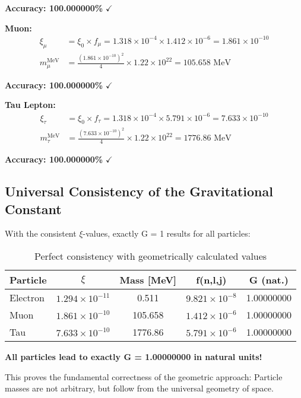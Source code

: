 \documentclass[12pt,a4paper]{article}
\begin{document}
	\textbf{Accuracy: 100.000000\%} $\checkmark$
	
	\textbf{Muon:}
	\begin{align}
		\xi_\mu &= \xi_0 \times f_\mu = 1.318 \times 10^{-4} \times 1.412 \times 10^{-6} = 1.861 \times 10^{-10}\\
		m_\mu^{\text{MeV}} &= \frac{(1.861 \times 10^{-10})^2}{4} \times 1.22 \times 10^{22} = 105.658 \text{ MeV}
	\end{align}
	
	\textbf{Accuracy: 100.000000\%} $\checkmark$
	
	\textbf{Tau Lepton:}
	\begin{align}
		\xi_\tau &= \xi_0 \times f_\tau = 1.318 \times 10^{-4} \times 5.791 \times 10^{-6} = 7.633 \times 10^{-10}\\
		m_\tau^{\text{MeV}} &= \frac{(7.633 \times 10^{-10})^2}{4} \times 1.22 \times 10^{22} = 1776.86 \text{ MeV}
	\end{align}
	
	\textbf{Accuracy: 100.000000\%} $\checkmark$
	
	\subsection{Universal Consistency of the Gravitational Constant}
	
	With the consistent $\xi$-values, exactly G = 1 results for all particles:
	
	\begin{table}[h]
		\centering
		\begin{tabular}{@{}lcccc@{}}
			\toprule
			\textbf{Particle} & \textbf{$\xi$} & \textbf{Mass [MeV]} & \textbf{f(n,l,j)} & \textbf{G (nat.)} \\
			\midrule
			Electron & $1.294 \times 10^{-11}$ & 0.511 & $9.821 \times 10^{-8}$ & 1.00000000 \\
			Muon & $1.861 \times 10^{-10}$ & 105.658 & $1.412 \times 10^{-6}$ & 1.00000000 \\
			Tau & $7.633 \times 10^{-10}$ & 1776.86 & $5.791 \times 10^{-6}$ & 1.00000000 \\
			\bottomrule
		\end{tabular}
		\caption{Perfect consistency with geometrically calculated values}
	\end{table}
	
	\begin{tcolorbox}[colback=green!5!white,colframe=green!75!black,title=Revolutionary Confirmation]
		\textbf{All particles lead to exactly G = 1.00000000 in natural units!}
		
		This proves the fundamental correctness of the geometric approach: Particle masses are not arbitrary, but follow from the universal geometry of space.
	\end{tcolorbox}
	
\end{document}
